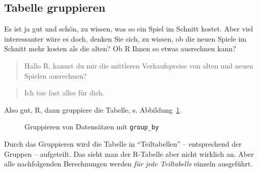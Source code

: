 \documentclass[
  letterpaper,
  oneside,
  open=any]{scrbook}
\theoremstyle{definition}
\theoremstyle{definition}
\theoremstyle{definition}
\theoremstyle{remark}
\begin{document}
\subsection{Tabelle gruppieren}\label{tabelle-gruppieren}

Es ist ja gut und schön, zu wissen, was so ein Spiel im Schnitt kostet.
Aber viel interessanter wäre es doch, denken Sie sich, zu wissen, ob die
neuen Spiele im Schnitt mehr kosten als die alten? Ob R Ihnen so etwas
ausrechnen kann?

\begin{quote}
{} Hallo R, kannst du mir die mittleren Verkaufspreise
von alten und neuen Spielen ausrechnen?
\end{quote}

\begin{quote}
{} Ich tue fast alles für dich. {}
\end{quote}

Also gut, R, dann gruppiere die Tabelle, s. Abbildung~\ref{fig-group}.

\begin{figure}


\caption{\label{fig-group}Gruppieren von Datensätzen mit
\texttt{group\_by}}

\end{figure}%

Durch das Gruppieren wird die Tabelle in \enquote{Teiltabellen} --
entsprechend der Gruppen -- aufgeteilt. Das sieht man der R-Tabelle aber
nicht wirklich an. Aber alle nachfolgenden Berechnungen werden \emph{für
jede Teiltabelle} einzeln ausgeführt.
\end{document}

